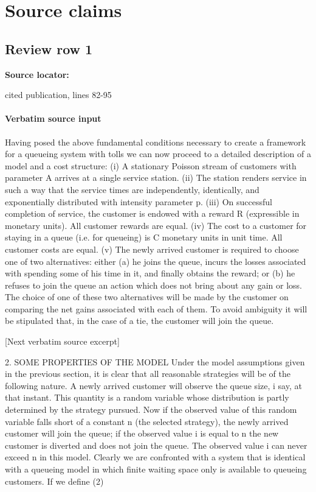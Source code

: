 \documentclass[10pt]{article}
\begin{document}
\section*{Source claims}
\subsection*{Review row 1}
\textbf{Source locator:} {\footnotesize\raggedright cited publication, lines 82-\allowbreak{}95\par}
\paragraph{Verbatim source input}
\begin{ReviewVerbatim}
Having posed the above fundamental conditions necessary to create a framework for a queueing system with tolls we can now proceed to a detailed description of a model and a cost structure:
(i) A stationary Poisson stream of customers with parameter A arrives at a
single service station.
(ii) The station renders service in such a way that the service times are independently, identically, and exponentially distributed with intensity parameter p.
(iii) On successful completion of service, the customer is endowed with a reward
R (expressible in monetary units). All customer rewards are equal.
(iv) The cost to a customer for staying in a queue (i.e. for queueing) is C monetary units in unit time. All customer costs are equal.
(v) The newly arrived customer is required to choose one of two alternatives:
either (a) he joins the queue, incurs the losses associated with spending some of
his time in it, and finally obtains the reward; or (b) he refuses to join the queue an
action which does not bring about any gain or loss. The choice of one of these two
alternatives will be made by the customer on comparing the net gains associated
with each of them. To avoid ambiguity it will be stipulated that, in the case of a tie,
the customer will join the queue.

[Next verbatim source excerpt]

2. SOME PROPERTIES OF THE MODEL
Under the model assumptions given in the previous section, it is clear that all
reasonable strategies will be of the following nature. A newly arrived customer
will observe the queue size, i say, at that instant. This quantity is a random variable
whose distribution is partly determined by the strategy pursued. Now if the observed value of this random variable falls short of a constant n (the selected strategy),
the newly arrived customer will join the queue; if the observed value i is equal to n
the new customer is diverted and does not join the queue. The observed value i
can never exceed n in this model.
Clearly we are confronted with a system that is identical with a queueing model
in which finite waiting space only is available to queueing customers. If we define
(2)


\end{ReviewVerbatim}
\end{document}
